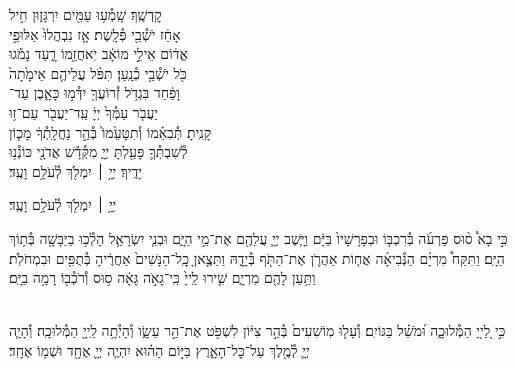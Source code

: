 \documentclass[twoside, openany, parskip=half, 11pt]{book}
\begin{document}
קׇדְשֶֽׁךָ׃ \hfill שָֽׁמְ֯ע֥וּ עַמִּ֖ים יִרְגָּז֑וּן \hfill חִ֣יל \\
אָחַ֔ז יֹשְׁ֯בֵ֖י פְּ֯לָֽשֶׁת׃ \hfill אָ֤ז נִבְהֲלוּ֙ אַלּוּפֵ֣י \\
אֱד֔וֹם \hfill אֵילֵ֣י מוֹאָ֔ב יֹֽאחֲזֵ֖מוֹ רָ֑עַד \hfill נָמֹ֕גוּ \\
כֹּ֖ל יֹשְׁ֯בֵ֥י כְ֯נָֽעַן׃ \hfill תִּפֹּ֨ל עֲלֵיהֶ֤ם אֵימָ֙תָה֙ \\
וָפַ֔חַד \hfill בִּגְדֹ֥ל זְ֯רוֹעֲךָ֖ יִדְּ֯מ֣וּ כָּאָ֑בֶן \hfill עַד־\\
יַעֲבֹ֤ר עַמְּ֯ךָ֙ יְיָ֔ \hfill עַֽד־יַעֲבֹ֖ר עַם־ז֥וּ \\
קָנִֽיתָ׃ \hfill תְּ֯בִאֵ֗מוֹ וְ֯תִטָּעֵ֙מוֹ֙ בְּ֯הַ֣ר נַחֲלָֽתְ֯ךָ֔ \hfill מָכ֧וֹן \\
לְ֯שִׁבְתְּ֯ךָ֛ פָּעַ֖לְתָּ יְיָ֑ \hfill מִקְּ֯דָ֕שׁ אֲדֹנָ֖י כּוֹנְ֯נ֥וּ \\
יָדֶֽיךָ׃ \hfill יְיָ֥ ׀ יִמְלֹ֖ךְ לְ֯עֹלָ֥ם וָעֶֽד׃\hfill \break
\begin{small}
יְיָ֥ ׀ יִמְלֹ֖ךְ לְ֯עֹלָ֥ם וָעֶֽד׃\\
\end{small}
\begin{small}
כִּ֣י בָא֩ ס֨וּס פַּרְעֹ֜ה בְּ֯רִכְבּ֤וֹ וּבְפָרָשָׁיו֙ בַּיָּ֔ם וַיָּ֧שֶׁב יְיָ֛ עֲלֵהֶ֖ם אֶת־מֵ֣י הַיָּ֑ם וּבְנֵ֧י יִשְׂרָאֵ֛ל הָלְ֯כ֥וּ בַיַּבָּשָׁ֖ה בְּ֯ת֥וֹךְ הַיָּֽם׃ וַתִּקַּח֩ מִרְיָ֨ם הַנְּ֯בִיאָ֜ה אֲח֧וֹת אַהֲרֹ֛ן אֶת־הַתֹּ֖ף בְּ֯יָדׇ֑הּ וַתֵּצֶ֤אןָ כׇֽל־הַנָּשִׁים֙ אַחֲרֶ֔יהָ בְּ֯תֻפִּ֖ים וּבִמְחֹלֹֽת׃ וַתַּ֥עַן לָהֶ֖ם מִרְיָ֑ם שִׁ֤ירוּ לַֽייָ֙ כִּֽי־גָאֹ֣ה גָּאָ֔ה ס֥וּס וְ֯רֹכְ֯ב֖וֹ רָמָ֥ה בַיָּֽם׃\end{small}
\\
כִּ֣י לַ֭ייָ֭ הַמְּ֯לוּכָ֑ה וּ֝מֹשֵׁ֗ל בַּגּוֹיִֽם׃
וְ֯עָל֤וּ מֽוֹשִׁעִים֙ בְּ֯הַ֣ר צִיּ֔וֹן לִשְׁפֹּ֖ט אֶת־הַ֣ר עֵשָׂ֑ו וְ֯הָיְ֯תָ֥ה לַֽייָ֖ הַמְּ֯לוּכָֽה׃
וְ֯הָיָ֧ה יְיָ֛ לְ֯מֶ֖לֶךְ עַל־כׇּל־הָאָ֑רֶץ בַּיּ֣וֹם הַה֗וּא יִהְיֶ֧ה יְיָ֛ אֶחָ֖ד וּשְׁמ֥וֹ אֶחָֽד׃
\end{document}

